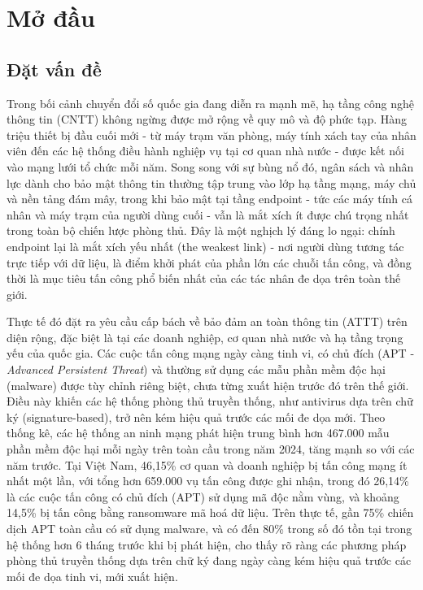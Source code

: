 \chapter*{Mở đầu}

\section*{Đặt vấn đề}

Trong bối cảnh chuyển đổi số quốc gia đang diễn ra mạnh mẽ, hạ tầng công nghệ
thông tin (CNTT) không ngừng được mở rộng về quy mô và độ phức tạp. Hàng triệu
thiết bị đầu cuối mới - từ máy trạm văn phòng, máy tính xách tay của nhân viên
đến các hệ thống điều hành nghiệp vụ tại cơ quan nhà nước - được kết nối vào
mạng lưới tổ chức mỗi năm. Song song với sự bùng nổ đó, ngân sách và nhân lực
dành cho bảo mật thông tin thường tập trung vào lớp hạ tầng mạng, máy chủ và
nền tảng đám mây, trong khi bảo mật tại tầng endpoint - tức các máy tính cá
nhân và máy trạm của người dùng cuối - vẫn là mắt xích ít được chú trọng nhất
trong toàn bộ chiến lược phòng thủ. Đây là một nghịch lý đáng lo ngại: chính
endpoint lại là mắt xích yếu nhất (the weakest link) - nơi người dùng tương
tác trực tiếp với dữ liệu, là điểm khởi phát của phần lớn các chuỗi tấn công,
và đồng thời là mục tiêu tấn công phổ biến nhất của các tác nhân đe dọa trên
toàn thế giới.

Thực tế đó đặt ra yêu cầu cấp bách về bảo đảm an toàn thông tin (ATTT) trên
diện rộng, đặc biệt là tại các doanh nghiệp, cơ quan nhà nước và hạ tầng trọng
yếu của quốc gia. Các cuộc tấn công mạng ngày càng tinh vi, có chủ đích
(APT - \textit{Advanced Persistent Threat}) và thường sử dụng các mẫu phần
mềm độc hại (malware) được tùy chỉnh riêng biệt, chưa từng xuất hiện trước đó
trên thế giới. Điều này khiến các hệ thống phòng thủ truyền thống, như antivirus
dựa trên chữ ký (signature-based), trở nên kém hiệu quả trước các mối đe dọa
mới. Theo thống kê, các hệ thống an ninh mạng phát hiện trung bình hơn 467.000
mẫu phần mềm độc hại mỗi ngày trên toàn cầu trong năm 2024, tăng mạnh so với
các năm trước. \cite{kaspersky2024} Tại Việt Nam, 46,15\% cơ quan và doanh
nghiệp bị tấn công mạng ít nhất một lần, với tổng hơn 659.000 vụ tấn công được
ghi nhận, trong đó 26,14\% là các cuộc tấn công có chủ đích (APT) sử dụng mã
độc nằm vùng, và khoảng 14,5\% bị tấn công bằng ransomware mã hoá dữ liệu.
Trên thực tế, gần 75\% chiến dịch APT toàn cầu có sử dụng malware, và có đến
80\% trong số đó tồn tại trong hệ thống hơn 6 tháng trước khi bị phát hiện,
\cite{safegate2024} cho thấy rõ ràng các phương pháp phòng thủ truyền thống
dựa trên chữ ký đang ngày càng kém hiệu quả trước các mối đe dọa tinh vi,
mới xuất hiện.

